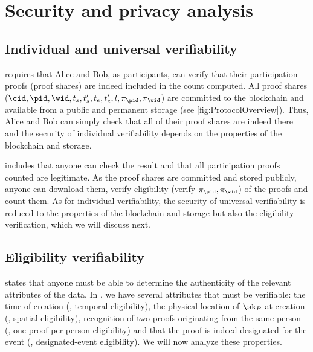 \section{Security and privacy analysis}%
\label{SecurityAnalysis}



\subsection{Individual and universal verifiability}%
\label{analysis-individual}%
\label{analysis-universal}

 requires that Alice and Bob, as participants, can verify that their participation proofs (\ie proof shares) are indeed included in the count computed.
All proof shares (\ie \(\cid, \pid, \wid, t_s, t_s', t_e, t_e', l, \pi_\pid, \pi_{\wid}\)) are committed to the blockchain and available from a public and permanent storage (see \cref{fig:ProtocolOverview}).
Thus, Alice and Bob can simply check that all of their proof shares are indeed there and the security of individual verifiability depends on the properties of the blockchain and storage.

  includes that anyone can check the result and that all participation proofs counted are legitimate.
As the proof shares are committed and stored publicly, anyone can
download them, verify eligibility (\ie verify \(\pi_\pid,
\pi_{\wid}\)) of the proofs and count them.
As for individual verifiability, the security of universal verifiability is reduced to the properties of the blockchain and storage but also the eligibility verification, which we will discuss next.

\subsection{Eligibility verifiability}%
\label{analysis-eligibility}

 states that anyone must be able to determine the authenticity of the relevant attributes of the data.
In \PRIVO, we have several attributes that must be verifiable: the time of creation (\ie, temporal eligibility), the physical location of \(\sk_P\) at creation (\ie, spatial eligibility), recognition of two proofs originating from the same person (\ie, one-proof-per-person eligibility) and that the proof is indeed designated for the event (\ie, designated-event eligibility).
We will now analyze these properties.

